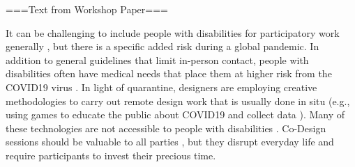 


===Text from Workshop Paper===

It can be challenging to include people with disabilities for participatory work generally \cite{wardReflectionsParticipatoryAction2001}, but there is a specific added risk during a global pandemic. In addition to general guidelines that limit in-person contact, people with disabilities often have medical needs that place them at higher risk from the COVID19 virus \cite{armitageCOVID19ResponseMust2020}. In light of quarantine, designers are employing creative methodologies to carry out remote design work that is usually done in situ \cite{whiteLearningCOVID19Design2020} (e.g., using games to educate the public about COVID19 and collect data \cite{lopezherna;ndezHealthcareGamificationSerious2020}). Many of these technologies are not accessible to people with disabilities \cite{annaswamyTelemedicineBarriersChallenges2020}. Co-Design sessions should be valuable to all parties \cite{bodkerParticipatoryDesignThat2018}, but they disrupt everyday life and require participants to invest their precious time. 

